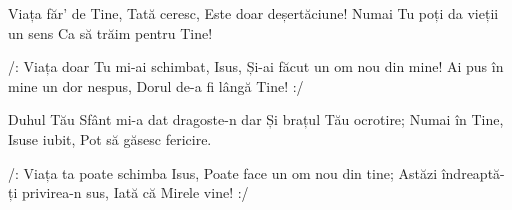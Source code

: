 \beginverse
Viața făr’ de Tine, Tată ceresc,
Este doar deșertăciune!
Numai Tu poți da vieții un sens
Ca să trăim pentru Tine!
\endverse

\beginchorus
/: Viața doar Tu mi-ai schimbat, Isus,
Și-ai făcut un om nou din mine!
Ai pus în mine un dor nespus,
Dorul de-a fi lângă Tine! :/
\endchorus

\beginverse
Duhul Tău Sfânt mi-a dat dragoste-n dar
Și brațul Tău ocrotire;
Numai în Tine, Isuse iubit,
Pot să găsesc fericire.
\endverse

\beginchorus
/: Viața ta poate schimba Isus,
Poate face un om nou din tine;
Astăzi îndreaptă-ți privirea-n sus,
Iată că Mirele vine! :/
\endchorus
\endsong